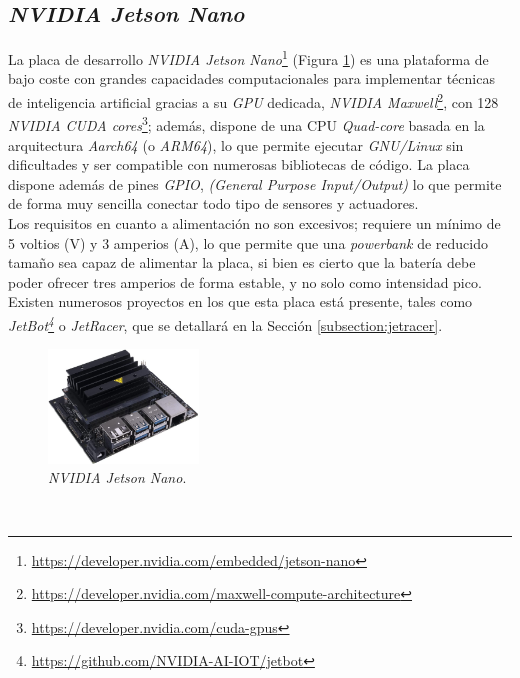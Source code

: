 \subsection{\textit{NVIDIA Jetson Nano}}
\label{subsection:jetsonnano}
La placa de desarrollo \textit{NVIDIA Jetson Nano}\footnote{\url{https://developer.nvidia.com/embedded/jetson-nano}} (Figura \ref{fig:jetsonnano}) es una plataforma de bajo coste con grandes capacidades computacionales para implementar técnicas de inteligencia artificial gracias a su \textit{GPU} dedicada, \textit{NVIDIA Maxwell}\footnote{\url{https://developer.nvidia.com/maxwell-compute-architecture}}, con 128 \textit{NVIDIA CUDA cores}\footnote{\url{https://developer.nvidia.com/cuda-gpus}}; además, dispone de una CPU \textit{Quad-core} basada en la arquitectura \textit{Aarch64} (o \textit{ARM64}), lo que permite ejecutar \textit{GNU/Linux} sin dificultades y ser compatible con numerosas bibliotecas de código. La placa dispone además de pines \textit{GPIO}, \textit{(General Purpose Input/Output)} lo que permite de forma muy sencilla conectar todo tipo de sensores y actuadores.\\

Los requisitos en cuanto a alimentación no son excesivos; requiere un mínimo de 5 voltios (V) y 3 amperios (A), lo que permite que una \textit{powerbank} de reducido tamaño sea capaz de alimentar la placa, si bien es cierto que la batería debe poder ofrecer tres amperios de forma estable, y no solo como intensidad pico. Existen numerosos proyectos en los que esta placa está presente, tales como \textit{JetBot\footnote{\url{https://github.com/NVIDIA-AI-IOT/jetbot}}} o \textit{JetRacer}, que se detallará en la Sección \ref{subsection:jetracer}.\\

\begin{figure} [h!]
	\begin{center}
		\includegraphics[width=4cm]{figs/jetsonnano}
	\end{center}
	\caption{\textit{NVIDIA Jetson Nano}.}
	\label{fig:jetsonnano}
\end{figure}\

